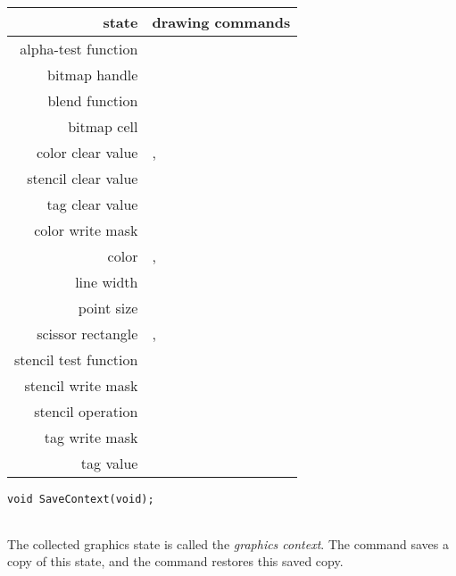 \begin{tabular}{rl}
state & drawing commands \\
\hline
alpha-test function   &  \nameref{AlphaFunc} \\
bitmap handle         &  \nameref{BitmapHandle} \\
blend function        &  \nameref{BlendFunc} \\
bitmap cell           &  \nameref{Cell} \\
color clear value     & \nameref{ClearColorA}, \nameref{ClearColorRGB} \\
stencil clear value   & \nameref{ClearStencil} \\
tag clear value       & \nameref{ClearTag} \\
color write mask      & \nameref{ColorMask} \\
color                 & \nameref{ColorA}, \nameref{ColorRGB} \\
line width            & \nameref{LineWidth} \\
point size            & \nameref{PointSize} \\
scissor rectangle     & \nameref{ScissorSize}, \nameref{ScissorXY} \\
stencil test function & \nameref{StencilFunc} \\
stencil write mask    & \nameref{StencilMask} \\
stencil operation     & \nameref{StencilOp} \\
tag write mask        & \nameref{TagMask} \\
tag value             & \nameref{Tag}
\end{tabular}




\begin{framed}
\begin{verbatim}
void SaveContext(void);
\end{verbatim}
\end{framed}

\begin{tabular}{lp{}}

\end{tabular}

\vspace{10pt}
The collected graphics state is called the \textit{graphics context}.
The  command saves a copy of this state, and the  command restores this saved copy.

